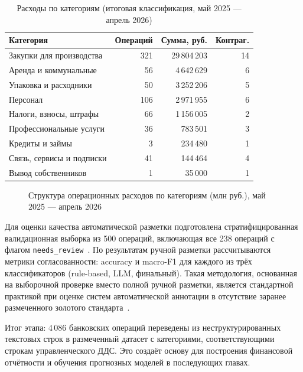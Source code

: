 \begin{table}[H]
\centering
\caption{Расходы по категориям (итоговая классификация, май 2025 --- апрель 2026)}
\label{tab:category_breakdown}
\begin{tabular}{lrrr}
\toprule
\textbf{Категория} & \textbf{Операций} & \textbf{Сумма, руб.} & \textbf{Контраг.} \\
\midrule
Закупки для производства & 321 & 29\,804\,203 & 14 \\
Аренда и коммунальные & 56 & 4\,642\,629 & 6 \\
Упаковка и расходники & 50 & 3\,252\,206 & 5 \\
Персонал & 106 & 2\,971\,955 & 6 \\
Налоги, взносы, штрафы & 66 & 1\,156\,005 & 2 \\
Профессиональные услуги & 36 & 783\,501 & 3 \\
Кредиты и займы & 3 & 234\,480 & 1 \\
Связь, сервисы и подписки & 41 & 144\,464 & 4 \\
Вывод собственников & 1 & 35\,000 & 1 \\
\bottomrule
\end{tabular}
\end{table}

\begin{figure}[H]
\centering
{}
\caption{Структура операционных расходов по категориям (млн руб.), май 2025 --- апрель 2026}
\label{fig:expenses_bar}
\end{figure}

Для оценки качества автоматической разметки подготовлена стратифицированная валидационная выборка из 500 операций, включающая все 238 операций с флагом \texttt{needs\_review}~\cite{pustejovsky2012natural}. По результатам ручной разметки рассчитываются метрики согласованности: accuracy и macro-F1 для каждого из трёх классификаторов (rule-based, LLM, финальный). Такая методология, основанная на выборочной проверке вместо полной ручной разметки, является стандартной практикой при оценке систем автоматической аннотации в отсутствие заранее размеченного золотого стандарта~\cite{pustejovsky2012natural}.

Итог этапа: 4\,086 банковских операций переведены из неструктурированных текстовых строк в размеченный датасет с категориями, соответствующими строкам управленческого ДДС. Это создаёт основу для построения финансовой отчётности и обучения прогнозных моделей в последующих главах.
